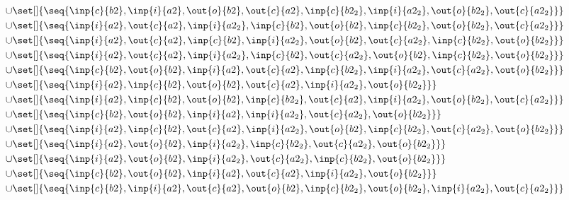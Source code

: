 \begin{align*}
\cup&\set[]{\seq{\inp{c}{b2},\inp{i}{a2},\out{o}{b2},\out{c}{a2},\inp{c}{b2_2},\inp{i}{a2_2},\out{o}{b2_2},\out{c}{a2_2}}}\\
\cup&\set[]{\seq{\inp{i}{a2},\out{c}{a2},\inp{i}{a2_2},\inp{c}{b2},\out{o}{b2},\inp{c}{b2_2},\out{o}{b2_2},\out{c}{a2_2}}}\\
\cup&\set[]{\seq{\inp{i}{a2},\out{c}{a2},\inp{c}{b2},\inp{i}{a2_2},\out{o}{b2},\out{c}{a2_2},\inp{c}{b2_2},\out{o}{b2_2}}}\\
\cup&\set[]{\seq{\inp{i}{a2},\out{c}{a2},\inp{i}{a2_2},\inp{c}{b2},\out{c}{a2_2},\out{o}{b2},\inp{c}{b2_2},\out{o}{b2_2}}}\\
\cup&\set[]{\seq{\inp{c}{b2},\out{o}{b2},\inp{i}{a2},\out{c}{a2},\inp{c}{b2_2},\inp{i}{a2_2},\out{c}{a2_2},\out{o}{b2_2}}}\\
\cup&\set[]{\seq{\inp{i}{a2},\inp{c}{b2},\out{o}{b2},\out{c}{a2},\inp{i}{a2_2},\out{o}{b2_2}}}\\
\cup&\set[]{\seq{\inp{i}{a2},\inp{c}{b2},\out{o}{b2},\inp{c}{b2_2},\out{c}{a2},\inp{i}{a2_2},\out{o}{b2_2},\out{c}{a2_2}}}\\
\cup&\set[]{\seq{\inp{c}{b2},\out{o}{b2},\inp{i}{a2},\inp{i}{a2_2},\out{c}{a2_2},\out{o}{b2_2}}}\\
\cup&\set[]{\seq{\inp{i}{a2},\inp{c}{b2},\out{c}{a2},\inp{i}{a2_2},\out{o}{b2},\inp{c}{b2_2},\out{c}{a2_2},\out{o}{b2_2}}}\\
\cup&\set[]{\seq{\inp{i}{a2},\out{o}{b2},\inp{i}{a2_2},\inp{c}{b2_2},\out{c}{a2_2},\out{o}{b2_2}}}\\
\cup&\set[]{\seq{\inp{i}{a2},\out{o}{b2},\inp{i}{a2_2},\out{c}{a2_2},\inp{c}{b2_2},\out{o}{b2_2}}}\\
\cup&\set[]{\seq{\inp{c}{b2},\out{o}{b2},\inp{i}{a2},\out{c}{a2},\inp{i}{a2_2},\out{o}{b2_2}}}\\
\cup&\set[]{\seq{\inp{c}{b2},\inp{i}{a2},\out{c}{a2},\out{o}{b2},\inp{c}{b2_2},\out{o}{b2_2},\inp{i}{a2_2},\out{c}{a2_2}}}\\
\end{align*}

